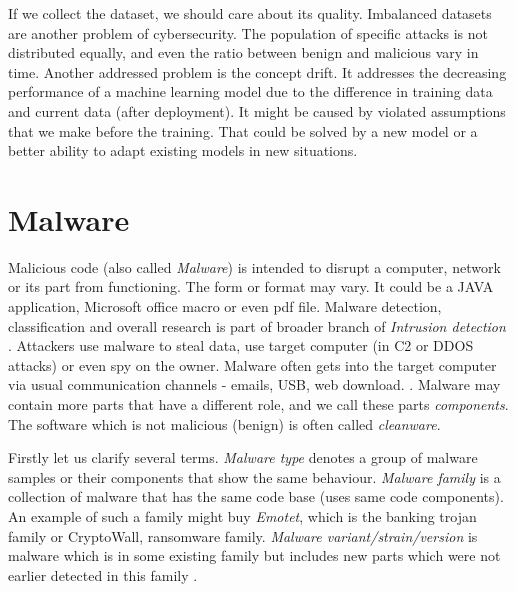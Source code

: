 If we collect the dataset, we should care about its quality. Imbalanced datasets are another problem of cybersecurity. The population of specific attacks is not distributed equally, and even the ratio between benign and malicious vary in time. Another addressed problem is the concept drift. It addresses the decreasing performance of a machine learning model due to the difference in training data and current data (after deployment).  It might be caused by violated assumptions that we make before the training. That could be solved by a new model or a better ability to adapt existing models in new situations.

\section{Malware}
Malicious code (also called \emph{Malware}) is intended to disrupt a computer, network or its part from functioning. The form or format may vary. It could be a JAVA application, Microsoft office macro or even pdf file. Malware detection, classification and overall research is part of broader branch of \emph{Intrusion detection} \cite{Cole2009}. Attackers use malware to steal data, use target computer (in C2 or DDOS attacks) or even spy on the owner. Malware often gets into the target computer via usual communication channels - emails, USB, web download. \cite{KA2018}. Malware may contain more parts that have a different role, and we call these parts \emph{components}. The software which is not malicious (benign) is often called \emph{cleanware}.

Firstly let us clarify several terms. \emph{Malware type} denotes a group of malware samples or their components that show the same behaviour. \emph{Malware family} is a collection of malware that has the same code base (uses same code components). An example of such a family might buy \emph{Emotet}, which is the banking trojan family or CryptoWall, ransomware family. \emph{Malware variant/strain/version} is malware which is in some existing family but includes new parts which were not earlier detected in this family \cite{Cohen2019}.

